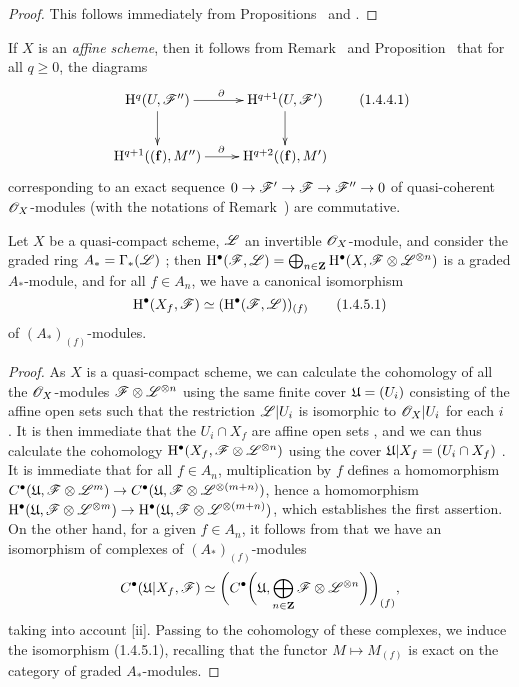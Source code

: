 \begin{proof}
\label{proof-3.1.4.3}
This follows immediately from Propositions~ and .
\end{proof}

\begin{env}[1.4.4]
\label{3.1.4.4}
If $X$ is an \emph{affine scheme}, then it follows from Remark~ and Proposition~ that for all $q\geq 0$, the diagrams
\[
  \xymatrix{
    \HH^q(U,\sh{F}'')\ar[r]^\partial\ar[d] &
    \HH^{q+1}(U,\sh{F}')\ar[d]\\
    \HH^{q+1}((\mathbf{f}),M'')\ar[r]^\partial &
    \HH^{q+2}((\mathbf{f}),M')
  }
  \tag{1.4.4.1}
\]
corresponding to an exact sequence $0\to\sh{F}'\to\sh{F}\to\sh{F}''\to 0$ of quasi-coherent $\mathscr{O}_X$-modules (with the notations of Remark~) are commutative.
\end{env}

\begin{prop}
\label{3.1.4.5}
Let $X$ be a quasi-compact scheme, $\mathscr{L}$ an invertible $\mathscr{O}_X$-module, and consider the graded ring $A_*=\Gamma_*(\mathscr{L})$ ; then $\mathrm{H}^\bullet(\mathscr{F},\mathscr{L})=\bigoplus_{n\in\mathbf{Z}}\mathrm{H}^\bullet(X,\mathscr{F}\otimes\mathscr{L}^{\otimes n})$ is a graded $A_*$-module, and for all $f\in A_n$, we have a canonical isomorphism
\[
  \mathrm{H}^\bullet(X_f,\mathscr{F})\simeq(\mathrm{H}^\bullet(\mathscr{F},\mathscr{L}))_{(f)}
  \tag{1.4.5.1}
\]
of $(A_*)_{(f)}$-modules.
\end{prop}

\begin{proof}
\label{proof-3.1.4.5}
As $X$ is a quasi-compact scheme, we can calculate the cohomology of all the $\mathscr{O}_X$-modules $\mathscr{F}\otimes\mathscr{L}^{\otimes n}$ using the same finite cover $\mathfrak{U}=(U_i)$ consisting of the affine open sets such that the restriction $\mathscr{L}|U_i$ is isomorphic to $\mathscr{O}_X|U_i$ for each $i$ .
It is then immediate that the $U_i\cap X_f$ are affine open sets , and we can thus calculate the cohomology $\mathrm{H}^\bullet(X_f,\mathscr{F}\otimes\mathscr{L}^{\otimes n})$ using the cover $\mathfrak{U}|X_f=(U_i\cap X_f)$ .
It is immediate that for all $f\in A_n$, multiplication by $f$ defines a homomorphism $C^\bullet(\fk{U},\sh{F}\otimes\sh{L}^m)\to C^\bullet(\fk{U},\sh{F}\otimes\sh{L}^{\otimes(m+n)})$, hence a homomorphism $\HH^\bullet(\fk{U},\sh{F}\otimes\sh{L}^{\otimes m})\to\HH^\bullet(\fk{U},\sh{F}\otimes\sh{L}^{\otimes(m+n)})$, which establishes the first assertion.
On the other hand, for a given $f\in A_n$, it follows from  that we have an isomorphism of complexes of $(A_*)_{(f)}$-modules
\[
  C^\bullet(\mathfrak{U}|X_f,\mathscr{F})\simeq\bigg(C^\bullet\bigg(\mathfrak{U},\bigoplus_{n\in\mathbf{Z}}\mathscr{F}\otimes\mathscr{L}^{\otimes n}\bigg)\bigg)_{(f)},
\]
taking into account [ii].
Passing to the cohomology of these complexes, we induce the isomorphism (1.4.5.1), recalling that the functor $M\mapsto M_{(f)}$ is exact on the category of graded $A_*$-modules.
\end{proof}

